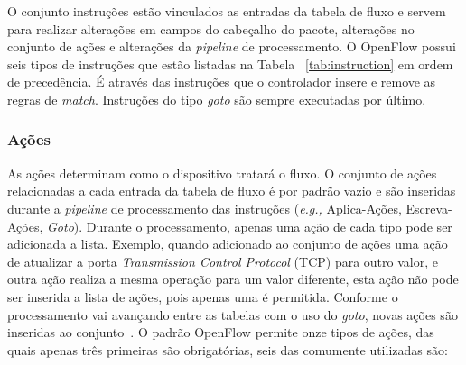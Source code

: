 O conjunto instruções estão vinculados as entradas da tabela de fluxo e servem para realizar alterações em campos do cabeçalho do pacote, alterações no conjunto de ações e alterações da \textit{pipeline} de processamento. O OpenFlow possui seis tipos de instruções que estão listadas na Tabela ~\ref{tab:instruction} em ordem de precedência. É através das instruções que o controlador insere e remove as regras de \textit{match}.
Instruções do tipo \emph{goto} são sempre executadas por último. 

\subsubsection{Ações}
As ações determinam como o dispositivo tratará o fluxo. O conjunto de ações relacionadas a cada entrada da tabela de fluxo é por padrão vazio e são inseridas durante a \textit{pipeline} de processamento das instruções (\emph{e.g.,} Aplica-Ações, Escreva-Ações, \emph{Goto}). Durante o processamento, apenas uma ação de cada tipo pode ser adicionada a lista. Exemplo, quando adicionado ao conjunto de ações uma ação de atualizar a porta \emph{Transmission Control Protocol} (TCP) para outro valor, e outra ação realiza a mesma operação para um valor diferente, esta ação não pode ser inserida a lista de ações, pois apenas uma é permitida. Conforme o processamento vai avançando entre as tabelas com o uso do \emph{goto}, novas ações são inseridas ao conjunto~\cite{nygren2015openflow}. O padrão OpenFlow permite onze tipos de ações, das quais apenas três primeiras são obrigatórias, seis das comumente utilizadas são: 
